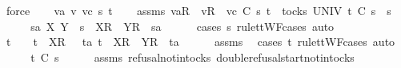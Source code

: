 \begin{isabellebody}
\ force\isanewline
{}\isamarkupfalse%
\isanewline
\ \ \isamarkupfalse%
\ va\ v\ vc\ s{}{\isacharprime}\ t\isanewline
\ \ \isamarkupfalse%
\ assms{\isacharcolon}\ {\isachardoublequoteopen}{\isacharbrackleft}va{\isacharbrackright}\isactrlsub R\ {\isacharhash}\ {\isacharbrackleft}v{\isacharbrackright}\isactrlsub R\ {\isacharhash}\ vc\ {\isasymsubseteq}\isactrlsub C\ s{}{\isacharprime}{\isachardoublequoteclose}\ {\isachardoublequoteopen}t\ {\isasymin}\ tocks\ UNIV{\isachardoublequoteclose}\ {\isachardoublequoteopen}t\ {\isasymle}\isactrlsub C\ s{}{\isacharprime}\ {\isacharat}\ s{}{\isachardoublequoteclose}\isanewline
\ \ \isamarkupfalse%
\ \isamarkupfalse%
\ s{}{\isacharprime}a\ X\ Y\ \ {\isachardoublequoteopen}s{}{\isacharprime}\ {\isacharequal}\ {\isacharbrackleft}X{\isacharbrackright}\isactrlsub R\ {\isacharhash}\ {\isacharbrackleft}Y{\isacharbrackright}\isactrlsub R\ {\isacharhash}\ s{}{\isacharprime}a{\isachardoublequoteclose}\isanewline
\ \ \ \ \isamarkupfalse%
\ {\isacharparenleft}cases\ s{}{\isacharprime}\ rule{\isacharcolon}ttWF{\isachardot}cases{\isacharcomma}\ auto{\isacharparenright}\isanewline
\ \ \isamarkupfalse%
\ \isamarkupfalse%
\ {\isachardoublequoteopen}t\ {\isacharequal}\ {\isacharbrackleft}{\isacharbrackright}\ {\isasymor}\ t\ {\isacharequal}\ {\isacharbrackleft}{\isacharbrackleft}X{\isacharbrackright}\isactrlsub R{\isacharbrackright}\ {\isasymor}\ {\isacharparenleft}{\isasymexists}\ ta{\isachardot}\ t\ {\isacharequal}\ {\isacharbrackleft}X{\isacharbrackright}\isactrlsub R\ {\isacharhash}\ {\isacharbrackleft}Y{\isacharbrackright}\isactrlsub R\ {\isacharhash}\ ta{\isacharparenright}{\isachardoublequoteclose}\isanewline
\ \ \ \ \isamarkupfalse%
\ assms{\isacharparenleft}{}{\isacharparenright}\ \isamarkupfalse%
\ {\isacharparenleft}cases\ t\ rule{\isacharcolon}ttWF{\isachardot}cases{\isacharcomma}\ auto{\isacharparenright}\isanewline
\ \ \isamarkupfalse%
\ \isamarkupfalse%
\ {\isachardoublequoteopen}t\ {\isasymle}\isactrlsub C\ s{}{\isacharprime}{\isachardoublequoteclose}\isanewline
\ \ \ \ \isamarkupfalse%
\ assms{\isacharparenleft}{}{\isacharparenright}\ refusal{\isacharunderscore}notin{\isacharunderscore}tocks\ double{\isacharunderscore}refusal{\isacharunderscore}start{\isacharunderscore}notin{\isacharunderscore}tocks\ \isamarkupfalse%

\end{isabellebody}
